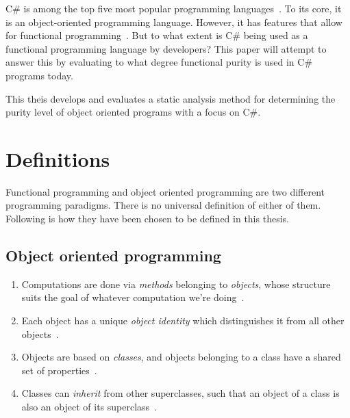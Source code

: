 \documentclass[a4paper,12pt]{article}
\begin{document}
C\# is among the top five most popular programming languages~\cite{tiobe}. To its core, it is an object-oriented programming language. However, it has features that allow for functional programming~\cite{hamid-mosalla}. But to what extent is C\# being used as a functional programming language by developers? This paper will attempt to answer this by evaluating to what degree functional purity is used in C\# programs today.

This theis develops and evaluates a static analysis method for determining the purity level of object oriented programs with a focus on C\#.



\section{Definitions} \label{sub:definitions}
Functional programming and object oriented programming are two different programming paradigms. There is no universal definition of either of them. Following is how they have been chosen to be defined in this thesis.

\subsection{Object oriented programming} \label{ssub:object-oriented-programming} %

\begin{enumerate}
\item Computations are done via \textit{methods} belonging to \textit{objects}, whose structure suits the goal of whatever computation we're doing~\cite{john-m-chambers}.
\item Each object has a unique \textit{object identity} which distinguishes it from all other objects~\cite{khoshafian1986object}.
\item Objects are based on \emph{classes}, and objects belonging to a class have a shared set of properties~\cite{john-m-chambers}.
\item Classes can \emph{inherit} from other superclasses, such that an object of a class is also an object of its superclass~\cite{john-m-chambers}.
\end{enumerate}
\end{document}
